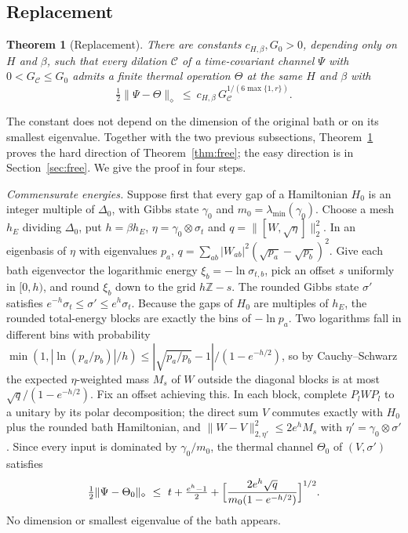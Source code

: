 \documentclass[11pt]{article}
\newtheorem{theorem}{Theorem}
\theoremstyle{definition}
\theoremstyle{remark}
\newcommand{\Dil}{\mathcal C}
\begin{document}
\subsection{Replacement}

\begin{theorem}[Replacement]\label{thm:replacement}
There are constants $c_{H,\beta},G_0>0$, depending only on $H$ and $\beta$, such that every dilation $\Dil$ of a time-covariant channel $\Psi$ with $0<G_{\Dil}\le G_0$ admits a finite thermal operation $\Theta$ at the same $H$ and $\beta$ with
\[
\tfrac12\|\Psi-\Theta\|_\diamond\ \le\ c_{H,\beta}\,G_{\Dil}^{1/(6\max\{1,r\})}.
\]
\end{theorem}

The constant does not depend on the dimension of the original bath or on its smallest eigenvalue. Together with the two previous subsections, Theorem~\ref{thm:replacement} proves the hard direction of Theorem~\ref{thm:free}; the easy direction is in Section~\ref{sec:free}. We give the proof in four steps.

\emph{Commensurate energies.} Suppose first that every gap of a Hamiltonian $H_0$ is an integer multiple of $\Delta_0$, with Gibbs state $\gamma_0$ and $m_0=\lambda_{\min}(\gamma_0)$. Choose a mesh $h_E$ dividing $\Delta_0$, put $h=\beta h_E$, $\eta=\gamma_0\otimes\sigma_t$ and $q=\|[W,\sqrt\eta]\|_2^2$. In an eigenbasis of $\eta$ with eigenvalues $p_a$, $q=\sum_{ab}|W_{ab}|^2(\sqrt{p_a}-\sqrt{p_b})^2$. Give each bath eigenvector the logarithmic energy $\xi_b=-\ln\sigma_{t,b}$, pick an offset $s$ uniformly in $[0,h)$, and round $\xi_b$ down to the grid $h\mathbb Z-s$. The rounded Gibbs state $\sigma'$ satisfies $e^{-h}\sigma_t\le\sigma'\le e^h\sigma_t$. Because the gaps of $H_0$ are multiples of $h_E$, the rounded total-energy blocks are exactly the bins of $-\ln p_a$. Two logarithms fall in different bins with probability $\min(1,|\ln(p_a/p_b)|/h)\le|\sqrt{p_a/p_b}-1|/(1-e^{-h/2})$, so by Cauchy--Schwarz the expected $\eta$-weighted mass $M_s$ of $W$ outside the diagonal blocks is at most $\sqrt q/(1-e^{-h/2})$. Fix an offset achieving this. In each block, complete $P_lWP_l$ to a unitary by its polar decomposition; the direct sum $V$ commutes exactly with $H_0$ plus the rounded bath Hamiltonian, and $\|W-V\|^2_{2,\eta'}\le2e^hM_s$ with $\eta'=\gamma_0\otimes\sigma'$. Since every input is dominated by $\gamma_0/m_0$, the thermal channel $\Theta_0$ of $(V,\sigma')$ satisfies
\[
\tfrac12\|\Psi-\Theta_0\|_\diamond\ \le\ t+\tfrac{e^h-1}2+\Bigl[\frac{2e^h\sqrt q}{m_0(1-e^{-h/2})}\Bigr]^{1/2}.
\]
No dimension or smallest eigenvalue of the bath appears.
\end{document}
